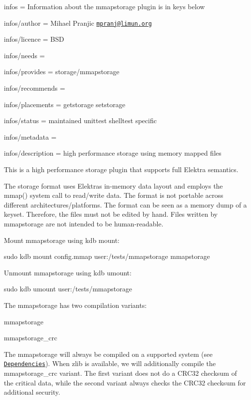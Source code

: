 
\begin{DoxyItemize}
\item infos = Information about the mmapstorage plugin is in keys below
\item infos/author = Mihael Pranjic \href{mailto:mpranj@limun.org}{\tt mpranj@limun.\+org}
\item infos/licence = B\+SD
\item infos/needs =
\item infos/provides = storage/mmapstorage
\item infos/recommends =
\item infos/placements = getstorage setstorage
\item infos/status = maintained unittest shelltest specific
\item infos/metadata =
\item infos/description = high performance storage using memory mapped files
\end{DoxyItemize}

This is a high performance storage plugin that supports full Elektra semantics.

The storage format uses Elektra\textquotesingle{}s in-\/memory data layout and employs the {\ttfamily mmap()} system call to read/write data. The format is not portable across different architectures/platforms. The format can be seen as a memory dump of a keyset. Therefore, the files must not be edited by hand. Files written by mmapstorage are not intended to be human-\/readable.

Mount mmapstorage using {\ttfamily kdb mount}\+:


\begin{DoxyCode}
sudo kdb mount config.mmap user:/tests/mmapstorage mmapstorage
\end{DoxyCode}


Unmount mmapstorage using {\ttfamily kdb umount}\+:


\begin{DoxyCode}
sudo kdb umount user:/tests/mmapstorage
\end{DoxyCode}


The mmapstorage has two compilation variants\+:


\begin{DoxyEnumerate}
\item mmapstorage
\item mmapstorage\+\_\+crc
\end{DoxyEnumerate}

The {\ttfamily mmapstorage} will always be compiled on a supported system (see \href{#dependencies}{\tt Dependencies}). When zlib is available, we will additionally compile the {\ttfamily mmapstorage\+\_\+crc} variant. The first variant does not do a C\+R\+C32 checksum of the critical data, while the second variant always checks the C\+R\+C32 checksum for additional security.

